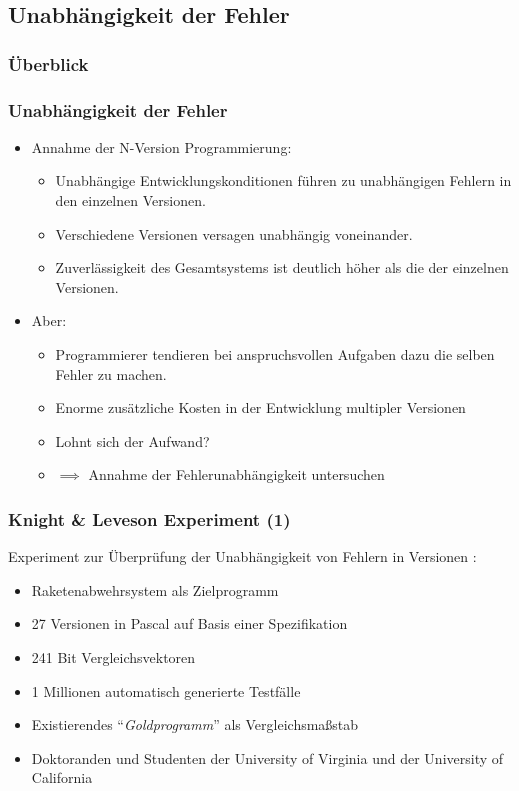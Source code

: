 \subsection{Unabhängigkeit der Fehler}
%
\begin{frame}
	\frametitle{Überblick}
	\tableofcontents[currentsubsection]
\end{frame}
%
\begin{frame}
	\frametitle{Unabhängigkeit der Fehler}
	\begin{itemize}
		\item Annahme der N-Version Programmierung:
			\begin{itemize}
				\item Unabhängige Entwicklungskonditionen führen zu unabhängigen Fehlern in den einzelnen Versionen.
				\item Verschiedene Versionen versagen unabhängig voneinander.
				\item Zuverlässigkeit des Gesamtsystems ist deutlich höher als die der einzelnen Versionen.
			\end{itemize}
			\pause
			\item Aber:
			\begin{itemize}
				\item Programmierer tendieren bei anspruchsvollen Aufgaben dazu die selben Fehler zu machen.
				\item Enorme zusätzliche Kosten in der Entwicklung multipler Versionen
				\item Lohnt sich der Aufwand?
				\item $\implies$ Annahme der Fehlerunabhängigkeit untersuchen
			\end{itemize}
		
	\end{itemize}
	
\end{frame}
%
%
\begin{frame}
	\frametitle{Knight \& Leveson Experiment (1)}

	 Experiment zur Überprüfung der Unabhängigkeit von Fehlern in Versionen \cite{Knight:1986:EEA:10677.10688}:
		\begin{itemize}
			\item Raketenabwehrsystem als Zielprogramm
			\item 27 Versionen in Pascal auf Basis einer Spezifikation
			\item 241 Bit Vergleichsvektoren
			\item 1 Millionen automatisch generierte Testfälle
			\item Existierendes \enquote{\emph{Goldprogramm}} als Vergleichsmaßstab
			\item Doktoranden und Studenten der University of Virginia und der University of California
		\end{itemize}

\end{frame}
